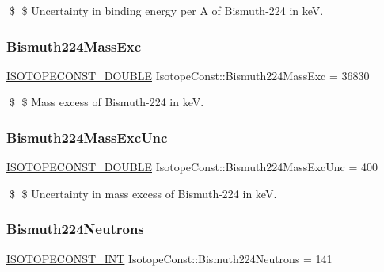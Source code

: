\$ \$ Uncertainty in binding energy per A of Bismuth-\/224 in keV. \mbox{\label{group___isotope_const-_bismuth-_bi224_gae73bd0d048c0111658a3f359763843a2}} 
\subsubsection{\texorpdfstring{Bismuth224\+Mass\+Exc}{Bismuth224MassExc}}
{\footnotesize\ttfamily \mbox{\hyperlink{group___isotope_const-_macros_ga8f45a7272ce02c0b4c65c44636ed719a}{I\+S\+O\+T\+O\+P\+E\+C\+O\+N\+S\+T\+\_\+\+D\+O\+U\+B\+LE}} Isotope\+Const\+::\+Bismuth224\+Mass\+Exc = 36830}

\$ \$ Mass excess of Bismuth-\/224 in keV. \mbox{\label{group___isotope_const-_bismuth-_bi224_ga706d82b2f8ee0664feeffbf7bb3144dc}} 
\subsubsection{\texorpdfstring{Bismuth224\+Mass\+Exc\+Unc}{Bismuth224MassExcUnc}}
{\footnotesize\ttfamily \mbox{\hyperlink{group___isotope_const-_macros_ga8f45a7272ce02c0b4c65c44636ed719a}{I\+S\+O\+T\+O\+P\+E\+C\+O\+N\+S\+T\+\_\+\+D\+O\+U\+B\+LE}} Isotope\+Const\+::\+Bismuth224\+Mass\+Exc\+Unc = 400}

\$ \$ Uncertainty in mass excess of Bismuth-\/224 in keV. \mbox{\label{group___isotope_const-_bismuth-_bi224_ga52dd899262ea578210c1a113b97a225d}} 
\subsubsection{\texorpdfstring{Bismuth224\+Neutrons}{Bismuth224Neutrons}}
{\footnotesize\ttfamily \mbox{\hyperlink{group___isotope_const-_macros_ga5f18360b3e99483a35c32d789e62621c}{I\+S\+O\+T\+O\+P\+E\+C\+O\+N\+S\+T\+\_\+\+I\+NT}} Isotope\+Const\+::\+Bismuth224\+Neutrons = 141}

